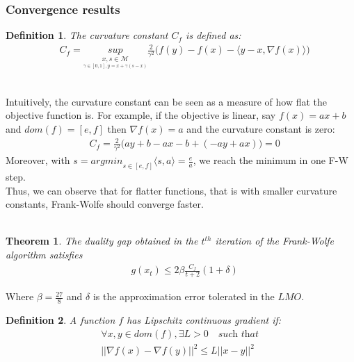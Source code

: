 \documentclass{article}
\newtheorem{theorem}{Theorem}
\newtheorem{definition}{Definition}
\begin{document}
\subsubsection{Convergence results}
\begin{definition} \cite{Jaggi13}
The curvature constant $C_{f}$ is defined as:
\begin{equation*}
\begin{aligned}
    &C_{f}= \underset{\underset{ \gamma\in[0,1], y=x+\gamma(s-x)}{x,s\in\mathcal{M}}}{sup}\frac{2}{\gamma^{2}}\Big(f(y)- f(x)- \langle y-x, \nabla f(x)\rangle\Big)
\end{aligned}
\end{equation*}
\end{definition}
\\
Intuitively, the curvature constant can be seen as a measure of how flat the objective function is. For example, if the objective is linear, say $f(x)= ax+ b$ and $dom(f)=[e,f]$ then $\nabla f(x)= a$ and the curvature constant is zero:
\begin{equation*}
\begin{aligned}
    &C_{f}= \frac{2}{\gamma^{2}}\Big(ay+ b- ax- b +(-ay +ax)\Big)= 0
\end{aligned}
\end{equation*}
Moreover, with $s=\textit{argmin}_{s\in[e,f]}\langle s, a\rangle= \frac{e}{a}$, we reach the minimum in one F-W step.\\
Thus, we can observe that for flatter functions, that is with smaller curvature constants, Frank-Wolfe should converge faster.
\\
\\
\begin{theorem}
The duality gap obtained in the $t^{th}$ iteration of the Frank-Wolfe algorithm satisfies
\begin{equation*}
\begin{aligned}
    &g(x_{t})\leq 2\beta\frac{C_{f}}{t+2}(1+\delta)
\end{aligned}
\end{equation*}
\end{theorem}
Where $\beta= \frac{27}{8}$ and $\delta$ is the approximation error tolerated in the $LMO$.
\begin{definition}
A function $f$ has Lipschitz continuous gradient if: 
\begin{equation*}
\begin{aligned}
    &\forall x,y \in dom(f), \exists L >0 \quad\textit{such that}\quad\\
    &||\nabla f(x) -\nabla f(y)||^2 \leq L||x - y||^2
\end{aligned}
\end{equation*}
\end{definition}
\end{document}
